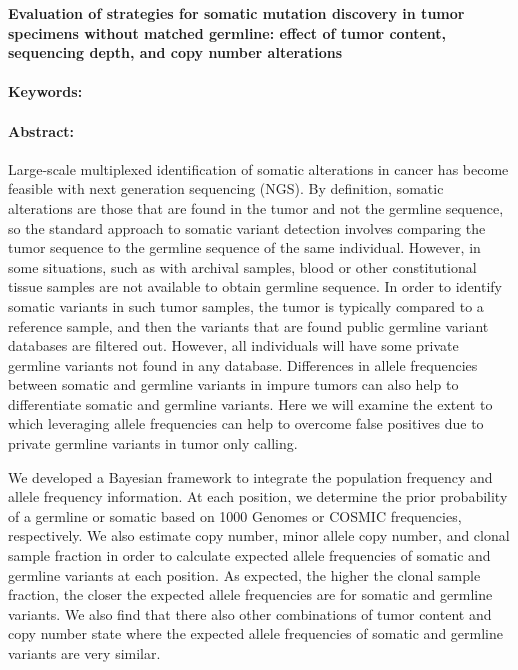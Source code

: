 \noindent
\large {\bf Evaluation of strategies for somatic mutation discovery in tumor specimens without matched germline: effect of tumor content, sequencing depth, and copy number alterations} 


\normalsize 


\noindent \paragraph{Keywords:} 

\noindent \paragraph{Abstract:} 

Large-scale multiplexed identification of somatic alterations in cancer has become
feasible with next generation sequencing (NGS). By definition, somatic alterations are
those that are found in the tumor and not the germline sequence, so the standard
approach to somatic variant detection involves comparing the tumor sequence to the
germline sequence of the same individual. However, in some situations, such as with
archival samples, blood or other constitutional tissue samples are not available to obtain
germline sequence. In order to identify somatic variants in such tumor samples, the
tumor is typically compared to a reference sample, and then the variants that are found
public germline variant databases are filtered out. However, all individuals will have
some private germline variants not found in any database. Differences in allele
frequencies between somatic and germline variants in impure tumors can also help to
differentiate somatic and germline variants. Here we will examine the extent to which
leveraging allele frequencies can help to overcome false positives due to private
germline variants in tumor only calling.

We developed a Bayesian framework to integrate the population frequency and allele
frequency information. At each position, we determine the prior probability of a germline
or somatic based on 1000 Genomes or COSMIC frequencies, respectively. We also
estimate copy number, minor allele copy number, and clonal sample fraction in order to
calculate expected allele frequencies of somatic and germline variants at each position.
As expected, the higher the clonal sample fraction, the closer the expected allele
frequencies are for somatic and germline variants. We also find that there also other
combinations of tumor content and copy number state where the expected allele
frequencies of somatic and germline variants are very similar.

